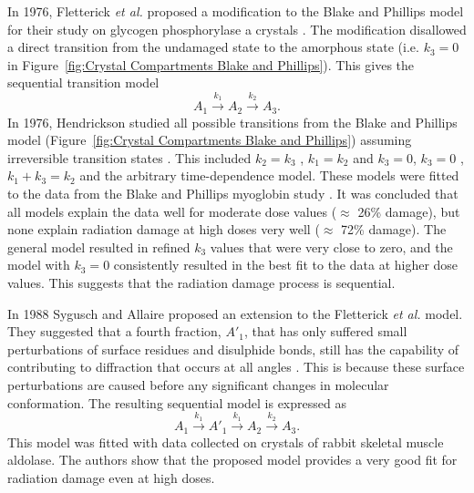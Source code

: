         In 1976, Fletterick \textit{et al.} proposed a modification to the Blake and Phillips model for their study on  glycogen phosphorylase a crystals \cite{fletterick1976low}.
        The modification disallowed a direct transition from the undamaged state to the amorphous state (i.e. $k_3 = 0$ in Figure~\ref{fig:Crystal Compartments Blake and Phillips}). This gives the sequential transition model
        \begin{equation}
            A_1 \xrightarrow{k_1} A_2 \xrightarrow{k_2} A_3.
        \end{equation}
        In 1976, Hendrickson studied all possible transitions from the Blake and Phillips model (Figure~\ref{fig:Crystal Compartments Blake and Phillips}) assuming irreversible transition states \cite{hendrickson1976}.
        This included $k_2 = k_3$ \cite{hendrickson1973}, $k_1 = k_2$ and $k_3 = 0$, $k_3 = 0$ \cite{fletterick1976low}, $k_1 + k_3 = k_2$ and the arbitrary time-dependence model.
        These models were fitted to the data from the Blake and Phillips myoglobin study \cite{blake1962}.
        It was concluded that all models explain the data well for moderate dose values ($\approx$ 26\% damage), but none explain radiation damage at high doses very well ($\approx$ 72\% damage).
        The general model resulted in refined $k_3$ values that were very close to zero, and the model with $k_3 = 0$ consistently resulted in the best fit to the data at higher dose values.
        This suggests that the radiation damage process is sequential.

		In 1988 Sygusch and Allaire proposed an extension to the Fletterick \textit{et al.} model.
        They suggested that a fourth fraction, $A'_1$, that has only suffered small perturbations of surface residues and disulphide bonds, still has the capability of contributing to diffraction that occurs at all angles \cite{sygusch1988}.
        This is because these surface perturbations are caused before any significant changes in molecular conformation.
        The resulting sequential model is expressed as
        \begin{equation}
            A_1 \xrightarrow{k_1} A'_1 \xrightarrow{k_1} A_2 \xrightarrow{k_2} A_3.
        \end{equation}
        This model was fitted with data collected on crystals of rabbit skeletal muscle aldolase. The authors show that the proposed model provides a very good fit for radiation damage even at high doses.

